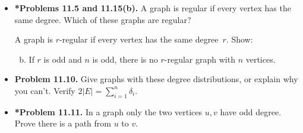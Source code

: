 \documentclass[11pt]{article}
\begin{document}
\begin{itemize}
\item \textbf{*Problems 11.5 and 11.15(b).}
A graph is regular if every vertex has the same degree.
Which of these graphs are regular?
\begin{enumerate}[(a)]
\end{enumerate}
A graph is $r$-regular if every vertex has the same degree~$r$. Show:
\begin{enumerate}[(a)]
\setcounter{enumi}{1}
\item If $r$ is odd and $n$ is odd, there is no $r$-regular graph with $n$ vertices.
\end{enumerate}

\vspace{0.1in}

\item \textbf{Problem 11.10.}
Give graphs with these degree distributions, or explain why you can't.
Verify $2|E|=\displaystyle\sum_{i=1}^n \delta_i$.
\begin{enumerate}[(a)]
\end{enumerate}

\vspace{0.1in}

\item \textbf{*Problem 11.11.}
In a graph only the two vertices $u,v$ have odd degree.
Prove there is a path from $u$ to $v$.


\end{itemize}
\end{document}
